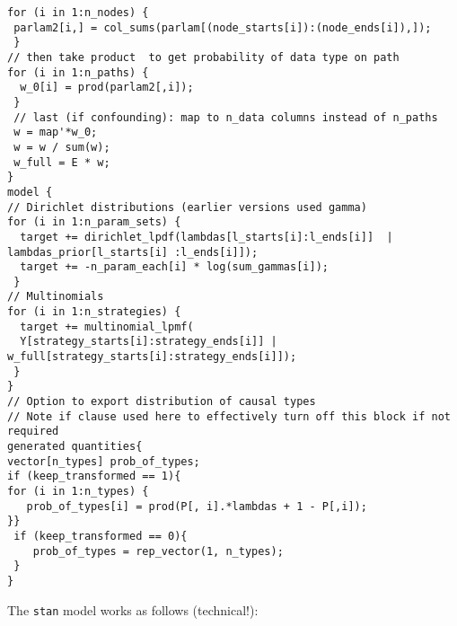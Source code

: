 \documentclass[
  12pt,
]{book}
\begin{document}
\begin{verbatim}
for (i in 1:n_nodes) {
 parlam2[i,] = col_sums(parlam[(node_starts[i]):(node_ends[i]),]);
 }
// then take product  to get probability of data type on path
for (i in 1:n_paths) {
  w_0[i] = prod(parlam2[,i]);
 }
 // last (if confounding): map to n_data columns instead of n_paths
 w = map'*w_0;
 w = w / sum(w);
 w_full = E * w;
}
model {
// Dirichlet distributions (earlier versions used gamma)
for (i in 1:n_param_sets) {
  target += dirichlet_lpdf(lambdas[l_starts[i]:l_ends[i]]  | lambdas_prior[l_starts[i] :l_ends[i]]);
  target += -n_param_each[i] * log(sum_gammas[i]);
 }
// Multinomials
for (i in 1:n_strategies) {
  target += multinomial_lpmf(
  Y[strategy_starts[i]:strategy_ends[i]] | w_full[strategy_starts[i]:strategy_ends[i]]);
 }
}
// Option to export distribution of causal types
// Note if clause used here to effectively turn off this block if not required
generated quantities{
vector[n_types] prob_of_types;
if (keep_transformed == 1){
for (i in 1:n_types) {
   prob_of_types[i] = prod(P[, i].*lambdas + 1 - P[,i]);
}}
 if (keep_transformed == 0){
    prob_of_types = rep_vector(1, n_types);
 }
}
\end{verbatim}

The \texttt{stan} model works as follows (technical!):
\end{document}

